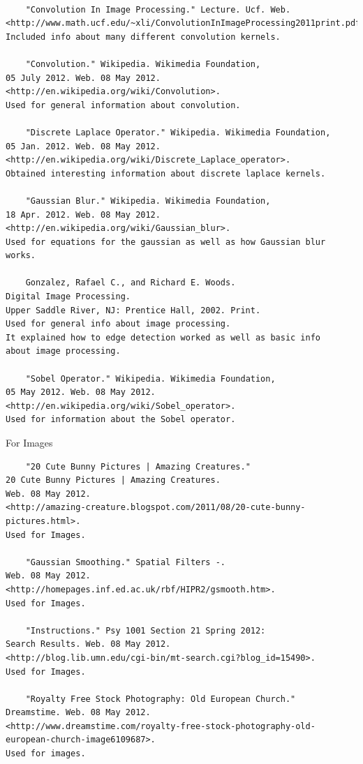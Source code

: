 \documentclass[11pt]{article}
\begin{document}
\begin{lstlisting}

	"Convolution In Image Processing." Lecture. Ucf. Web.
<http://www.math.ucf.edu/~xli/ConvolutionInImageProcessing2011print.pdf>.
Included info about many different convolution kernels.

	"Convolution." Wikipedia. Wikimedia Foundation, 
05 July 2012. Web. 08 May 2012. 
<http://en.wikipedia.org/wiki/Convolution>.
Used for general information about convolution.

	"Discrete Laplace Operator." Wikipedia. Wikimedia Foundation,
05 Jan. 2012. Web. 08 May 2012.
<http://en.wikipedia.org/wiki/Discrete_Laplace_operator>.
Obtained interesting information about discrete laplace kernels.

	"Gaussian Blur." Wikipedia. Wikimedia Foundation,
18 Apr. 2012. Web. 08 May 2012.
<http://en.wikipedia.org/wiki/Gaussian_blur>.
Used for equations for the gaussian as well as how Gaussian blur works.

	Gonzalez, Rafael C., and Richard E. Woods. 
Digital Image Processing.
Upper Saddle River, NJ: Prentice Hall, 2002. Print.
Used for general info about image processing.
It explained how to edge detection worked as well as basic info
about image processing.

	"Sobel Operator." Wikipedia. Wikimedia Foundation,
05 May 2012. Web. 08 May 2012.
<http://en.wikipedia.org/wiki/Sobel_operator>.
Used for information about the Sobel operator.
\end{lstlisting}

For Images
\begin{lstlisting}
	"20 Cute Bunny Pictures | Amazing Creatures." 
20 Cute Bunny Pictures | Amazing Creatures. 
Web. 08 May 2012. 
<http://amazing-creature.blogspot.com/2011/08/20-cute-bunny-pictures.html>.
Used for Images.

	"Gaussian Smoothing." Spatial Filters -.
Web. 08 May 2012.
<http://homepages.inf.ed.ac.uk/rbf/HIPR2/gsmooth.htm>.
Used for Images.

	"Instructions." Psy 1001 Section 21 Spring 2012:
Search Results. Web. 08 May 2012. 
<http://blog.lib.umn.edu/cgi-bin/mt-search.cgi?blog_id=15490>.
Used for Images.

	"Royalty Free Stock Photography: Old European Church."
Dreamstime. Web. 08 May 2012. 
<http://www.dreamstime.com/royalty-free-stock-photography-old-european-church-image6109687>.
Used for images.

\end{lstlisting}



	
\end{document}
